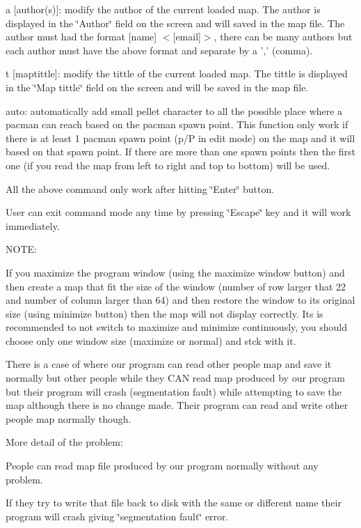 a \mbox{[}author(s)\mbox{]}\-: modify the author of the current loaded map. The author is displayed in the \char`\"{}\-Author\char`\"{} field on the screen and will saved in the map file. The author must had the format \mbox{[}name\mbox{]} $<$\mbox{[}email\mbox{]}$>$, there can be many authors but each author must have the above format and separate by a ',' (comma).

t \mbox{[}maptittle\mbox{]}\-: modify the tittle of the current loaded map. The tittle is displayed in the \char`\"{}\-Map tittle\char`\"{} field on the screen and will be saved in the map file.

auto\-: automatically add small pellet character to all the possible place where a pacman can reach based on the pacman spawn point. This function only work if there is at least 1 pacman spawn point (p/\-P in edit mode) on the map and it will based on that spawn point. If there are more than one spawn points then the first one (if you read the map from left to right and top to bottom) will be used.

All the above command only work after hitting \char`\"{}\-Enter\char`\"{} button.

User can exit command mode any time by pressing \char`\"{}\-Escape\char`\"{} key and it will work immediately.

N\-O\-T\-E\-:

If you maximize the program window (using the maximize window button) and then create a map that fit the size of the window (number of row larger that 22 and number of column larger than 64) and then restore the window to its original size (using minimize button) then the map will not display correctly. Its is recommended to not switch to maximize and minimize continuously, you should choose only one window size (maximize or normal) and stck with it.

There is a case of where our program can read other people map and save it normally but other people while they C\-A\-N read map produced by our program but their program will crash (segmentation fault) while attempting to save the map although there is no change made. Their program can read and write other people map normally though.

More detail of the problem\-:

People can read map file produced by our program normally without any problem.

If they try to write that file back to disk with the same or different name their program will crash giving \char`\"{}segmentation fault\char`\"{} error.

